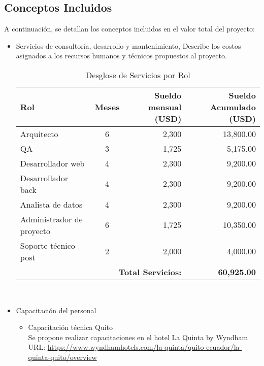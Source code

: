 \subsection{Conceptos Incluidos}
A continuación, se detallan los conceptos incluidos en el valor total del proyecto:
\begin{itemize}
    \item Servicios de consultoría, desarrollo y mantenimiento, Describe los costos asignados a los recursos humanos y técnicos propuestos al proyecto. \\
        \begin{table}[h]
            \centering
            \begin{tabular}{|l|c|r|r|}
                \hline
                \textbf{Rol} & \textbf{Meses} & \textbf{Sueldo mensual (USD)} & \textbf{Sueldo Acumulado (USD)} \\
                \hline
                Arquitecto & 6 & 2,300 & 13,800.00 \\
                QA & 3 & 1,725 & 5,175.00 \\
                Desarrollador web & 4 & 2,300 & 9,200.00 \\
                Desarrollador back & 4 & 2,300 & 9,200.00 \\
                Analista de datos & 4 & 2,300 & 9,200.00 \\
                Administrador de proyecto & 6 & 1,725 & 10,350.00 \\
                Soporte técnico post & 2 & 2,000 & 4,000.00 \\
                \hline
                \multicolumn{3}{|r|}{\textbf{Total Servicios:}} & \textbf{60,925.00} \\
                \hline
            \end{tabular}
            \caption{Desglose de Servicios por Rol}
            \label{tab:servicios-roles}
        \end{table} \\
    \item Capacitación del personal
    \begin{itemize}
        \item Capacitación técnica Quito \\
        Se propone realizar capacitaciones en el hotel La Quinta by Wyndham\\
        URL: \url{https://www.wyndhamhotels.com/la-quinta/quito-ecuador/la-quinta-quito/overview} \\
            \begin{table}[h]

\end{table}
\end{itemize}
\end{itemize}
